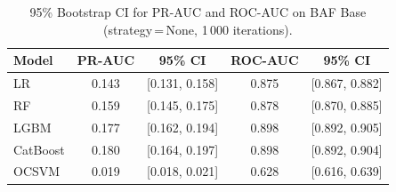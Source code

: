 \begin{table}[ht!]
\centering
\caption{95\% Bootstrap CI for PR-AUC and ROC-AUC on BAF Base (strategy\,=\,None, 1\,000 iterations).}
\label{tab:ci_baf}
\begin{tabular}{l c c c c}
\toprule
Model & PR-AUC & 95\% CI & ROC-AUC & 95\% CI \\
\midrule
LR         & 0.143 & [0.131, 0.158] & 0.875 & [0.867, 0.882] \\
RF         & 0.159 & [0.145, 0.175] & 0.878 & [0.870, 0.885] \\
LGBM       & 0.177 & [0.162, 0.194] & 0.898 & [0.892, 0.905] \\
CatBoost   & 0.180 & [0.164, 0.197] & 0.898 & [0.892, 0.904] \\
OCSVM      & 0.019 & [0.018, 0.021] & 0.628 & [0.616, 0.639] \\
\bottomrule
\end{tabular}
\end{table}